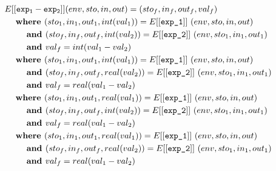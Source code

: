 \documentclass[12pt]{article}
\newcommand\eb[1]{[[\texttt{#1}]]}
\begin{document}
\begin{align*}
&E[[{\tt exp_1 - exp_2}]] (env,sto,in,out) = (sto_f,in_f,out_f,val_f)\\
&\hspace{3ex}\textbf{where } (sto_1,in_1,out_1,int(val_1)) = E\eb{exp\_1}\ (env,sto,in,out) \\
&\hspace{6ex}\textbf{and } (sto_f,in_f,out_f,int(val_2)) = E\eb{exp\_2}\ (env,sto_1,in_1,out_1) \\
&\hspace{6ex}\textbf{and } val_f = int(val_1 - val_2) \\
&\hspace{3ex}\textbf{where } (sto_1,in_1,out_1,int(val_1)) = E\eb{exp\_1}\ (env,sto,in,out) \\
&\hspace{6ex}\textbf{and } (sto_f,in_f,out_f,real(val_2)) = E\eb{exp\_2}\ (env,sto_1,in_1,out_1) \\
&\hspace{6ex}\textbf{and } val_f = real(val_1 - val_2) \\
&\hspace{3ex}\textbf{where } (sto_1,in_1,out_1,real(val_1)) = E\eb{exp\_1}\ (env,sto,in,out) \\
&\hspace{6ex}\textbf{and } (sto_f,in_f,out_f,int(val_2)) = E\eb{exp\_2}\ (env,sto_1,in_1,out_1) \\
&\hspace{6ex}\textbf{and } val_f = real(val_1 - val_2) \\
&\hspace{3ex}\textbf{where } (sto_1,in_1,out_1,real(val_1)) = E\eb{exp\_1}\ (env,sto,in,out) \\
&\hspace{6ex}\textbf{and } (sto_f,in_f,out_f,real(val_2)) = E\eb{exp\_2}\ (env,sto_1,in_1,out_1) \\
&\hspace{6ex}\textbf{and } val_f = real(val_1 - val_2) \\
\end{align*}
\end{document}
